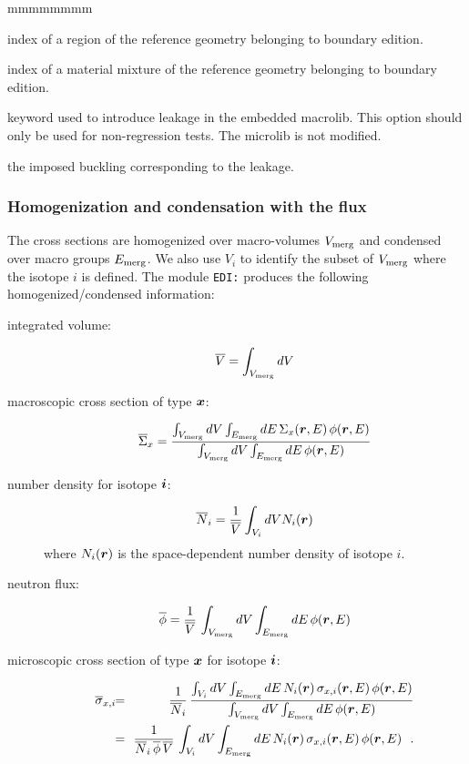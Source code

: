 \begin{ListeDeDescription}{mmmmmmmm}
\item[\dusa{ireg}] index of a region of the reference geometry belonging to boundary edition.

\item[\dusa{imix}] index of a material mixture of the reference geometry belonging to boundary edition.

\item[\moc{LEAK}] keyword used to introduce leakage in the embedded {\sc macrolib}. This option should only be used for non-regression tests. The {\sc microlib} is not modified.

\item[\dusa{b2}] the imposed buckling corresponding to the leakage.

\end{ListeDeDescription}

\subsubsection{Homogenization and condensation with the flux}

The cross sections are homogenized over macro-volumes $V_{\rm merg}$ and condensed over
macro groups $E_{\rm merg}$. We also use $V_i$ to identify the subset of $V_{\rm merg}$ where
the isotope $i$ is defined. The module {\tt EDI:} produces the following homogenized/condensed information:

\begin{description}
\item[integrated volume:]
$$
\overline V=\int_{V_{\rm merg}} dV
$$

\item[macroscopic cross section of type $\bff(x)$:]
$$
\overline \Sigma_x = {\int_{V_{\rm merg}} dV \int_{E_{\rm merg}} dE \, \Sigma_x(\bff(r),E) \, \phi(\bff(r),E)
\over \int_{V_{\rm merg}} dV \int_{E_{\rm merg}} dE \, \phi(\bff(r),E)}
$$

\item[number density for isotope $\bff(i)$:]
$$
\overline N_i= {1\over \overline V} \int_{V_i} dV N_i(\bff(r))
$$
\noindent where $N_i(\bff(r))$ is the space-dependent number density of isotope $i$.

\item[neutron flux:]
$$
\overline\phi = {1\over \overline V} \, \int_{V_{\rm merg}} dV \int_{E_{\rm merg}} dE \, \phi(\bff(r),E)
$$

\item[microscopic cross section of type $\bff(x)$ for isotope $\bff(i)$:]
\begin{eqnarray*}
\overline \sigma_{x,i} \negthinspace\negthinspace &=& \negthinspace\negthinspace { 1 \over \overline N_i} \, {\int_{V_i} dV \int_{E_{\rm merg}} dE \, N_i(\bff(r)) \, \sigma_{x,i}(\bff(r),E) \, \phi(\bff(r),E)
\over \int_{V_{\rm merg}} dV \int_{E_{\rm merg}} dE \, \phi(\bff(r),E)} \\
&=& \negthinspace\negthinspace { 1 \over \overline N_i\, \overline\phi \, \overline V} \, \int_{V_i} dV \int_{E_{\rm merg}} dE \, N_i(\bff(r)) \, \sigma_{x,i}(\bff(r),E) \, \phi(\bff(r),E) \ \ .
\end{eqnarray*}
\end{description}

